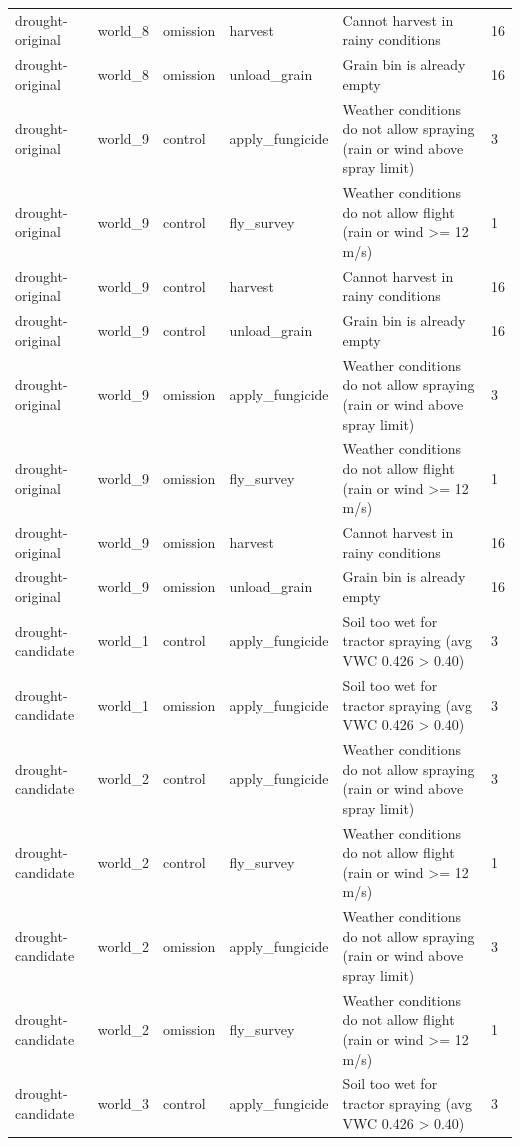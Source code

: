 {\begin{tabular}{llllll}
drought-original & world\_8 & omission & harvest & Cannot harvest in rainy conditions & 16 \\
drought-original & world\_8 & omission & unload\_grain & Grain bin is already empty & 16 \\
drought-original & world\_9 & control & apply\_fungicide & Weather conditions do not allow spraying (rain or wind above spray limit) & 3 \\
drought-original & world\_9 & control & fly\_survey & Weather conditions do not allow flight (rain or wind >= 12 m/s) & 1 \\
drought-original & world\_9 & control & harvest & Cannot harvest in rainy conditions & 16 \\
drought-original & world\_9 & control & unload\_grain & Grain bin is already empty & 16 \\
drought-original & world\_9 & omission & apply\_fungicide & Weather conditions do not allow spraying (rain or wind above spray limit) & 3 \\
drought-original & world\_9 & omission & fly\_survey & Weather conditions do not allow flight (rain or wind >= 12 m/s) & 1 \\
drought-original & world\_9 & omission & harvest & Cannot harvest in rainy conditions & 16 \\
drought-original & world\_9 & omission & unload\_grain & Grain bin is already empty & 16 \\
drought-candidate & world\_1 & control & apply\_fungicide & Soil too wet for tractor spraying (avg VWC 0.426 > 0.40) & 3 \\
drought-candidate & world\_1 & omission & apply\_fungicide & Soil too wet for tractor spraying (avg VWC 0.426 > 0.40) & 3 \\
drought-candidate & world\_2 & control & apply\_fungicide & Weather conditions do not allow spraying (rain or wind above spray limit) & 3 \\
drought-candidate & world\_2 & control & fly\_survey & Weather conditions do not allow flight (rain or wind >= 12 m/s) & 1 \\
drought-candidate & world\_2 & omission & apply\_fungicide & Weather conditions do not allow spraying (rain or wind above spray limit) & 3 \\
drought-candidate & world\_2 & omission & fly\_survey & Weather conditions do not allow flight (rain or wind >= 12 m/s) & 1 \\
drought-candidate & world\_3 & control & apply\_fungicide & Soil too wet for tractor spraying (avg VWC 0.426 > 0.40) & 3 \\

\end{tabular}}
